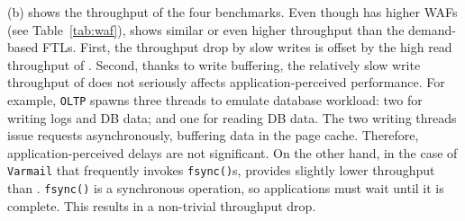 (b) shows the throughput of the four benchmarks.
Even though \texttt{\ours{}} has higher WAFs (see Table~\ref{tab:waf}), \OURS{}
shows similar or even higher throughput than the demand-based FTLs.  
First, the throughput drop by slow writes is offset by the high read
throughput of \ours{}.  Second, thanks to write buffering, the relatively
slow write throughput of \ours{} does not seriously affects
application-perceived performance.  For example, \texttt{OLTP} spawns three
threads to emulate database workload: two for writing logs and DB data; and one
for reading DB data.  The two writing threads issue requests asynchronously,
buffering data in the page cache. Therefore, application-perceived delays are
not significant. On the other hand, in the case of \texttt{Varmail} that frequently
invokes \texttt{fsync()}s, \ours{} provides slightly lower throughput
than \DFTL{}. \texttt{fsync()} is a synchronous operation, so applications 
must wait until it is complete. This results in a non-trivial throughput drop.

